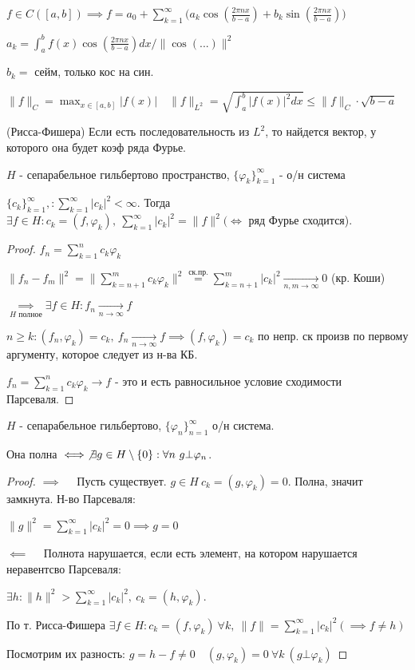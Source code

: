   $f \in C([a,b]) \implies f = a_0 + \sum^\infty_{k=1}\Big( a_k \cos(\frac{2 \pi nx}{b - a}) + b_k\sin(\frac{2 \pi nx}{b-a})\Big)$

  $a_k = \int^b_a f(x)\cos(\frac{2 \pi nx}{b - a})dx / \| \cos(...) \| ^2$

  $b_k =$ сейм, только кос на син.

  $\|f\|_C = \max_{x \in [a,b]} |f(x)| \quad \|f\|_{L^2} = \sqrt{\int^b_a|f(x)|^2dx} \le \|f\|_C \cdot \sqrt{b - a}$

  \begin{theorem}(Рисса-Фишера)
    Если есть последовательность из $L^2$, то найдется вектор, у которого она будет коэф ряда Фурье.

    $H$ - сепарабельное гильбертово пространство, $\{\varphi_k\}^\infty_{k=1}$ - о/н система

    $\{c_k\}_{k=1}^\infty, : \sum^\infty_{k=1} |c_k|^2 < \infty$. Тогда $\exists f \in H: c_k = (f, \varphi_k), \ \sum^\infty_{k=1}|c_k|^2 = \|f\|^2 (\iff$ ряд Фурье сходится).
  \end{theorem}
  \begin{proof}
    $f_n = \sum^n_{k=1}c_k\varphi_k$

    $\|f_n - f_m\|^2 = \|\sum_{k=n+1}^m c_k\varphi_k\|^2 \overset{\text{ск.пр.}}{=}\sum_{k=n+1}^m |c_k|^2 \underset{n, m \to \infty}{\longrightarrow} 0$ (кр. Коши)

    $\underset{H \text{ полное}}\implies \exists f \in H: f_n \underset{n \to \infty}{\longrightarrow} f$

    $n\ge k: (f_n, \varphi_k) = c_k, \ f_n \underset{n\to\infty}{\longrightarrow} f \implies (f, \varphi_k) = c_k$ по непр. ск произв по первому аргументу, которое следует из н-ва КБ.

    
    $f_n = \sum^n_{k=1} c_k\varphi_k \to f$ - это и есть равносильное условие сходимости Парсеваля.

  \end{proof}

  \begin{corollary}
    $H$ - сепарабельное гильбертово, $\{\varphi_n\}_{n=1}^\infty$ о/н система. 

    Она полна $\iff \not \exists g \in H\setminus\{0\}: \forall n \ g \bot \varphi_n$.
  \end{corollary}
  \begin{proof}
    $\boxed\implies\quad$ Пусть существует. $g \in H \ c_k = (g, \varphi_k) = 0$. Полна, значит замкнута. Н-во Парсеваля:

    $\|g\|^2 = \sum^\infty_{k=1}|c_k|^2 = 0 \implies g =0 $

    $\boxed\impliedby\quad$ Полнота нарушается, если есть элемент, на котором нарушается неравентсво Парсеваля:

    $\exists h: \|h\|^2 > \sum^\infty_{k=1}|c_k|^2, \ c_k = (h,\varphi_k)$.

    По т. Рисса-Фишера $\exists f \in H: c_k = (f, \varphi_k) \ \forall k, \ \| f\| = \sum^\infty_{k=1}|c_k|^2 (\implies f \neq h)$

    Посмотрим их разность:  $g = h -f\neq 0 \quad (g, \varphi_k) = 0 \ \forall k \ (g \bot \varphi_k)$
  \end{proof}

